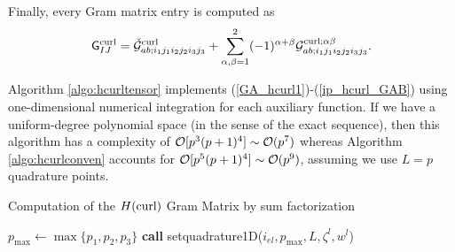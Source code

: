 Finally, every Gram matrix entry is computed as
%
\begin{equation}
    \mathsf{G}_{IJ}^{\operatorname{curl}}=
    \check{\mathcal{G}}^{\operatorname{curl}}_{ab;i_1j_1i_2j_2i_3j_3}+ \sum\limits_{\alpha,\beta=1}^{2}(-1)^{\alpha+\beta}\mathcal{G}^{\operatorname{curl};\alpha \beta}_{ab;i_1j_1i_2j_2i_3j_3}.
    \label{ip_hcurl_GAB}
\end{equation}

Algorithm \ref{algo:hcurltensor} implements (\ref{GA_hcurl1})-(\ref{ip_hcurl_GAB}) using one-dimensional numerical integration for each auxiliary function. If we have a uniform-degree polynomial space (in the sense of the exact sequence), then this algorithm has a complexity of $\mathcal{O}[p^3(p+1)^4]\sim \mathcal{O}(p^7)$ whereas Algorithm \ref{algo:hcurlconven} accounts for $\mathcal{O}[p^5(p+1)^4]\sim \mathcal{O}(p^9)$, assuming we use $L=p$ quadrature points.
%
\begin{algorithm}[ht!]
\caption{Computation of the $H(\operatorname{curl})$ Gram Matrix by sum factorization}\label{algo:hcurltensor}
\begin{algorithmic}
\State $p_{\max}\gets\max\{p_1,p_2,p_3\}$
\State\textbf{call }setquadrature1D($i_{el},p_{\max},L,\zeta^l,w^l$)


\end{algorithmic}
\end{algorithm}
